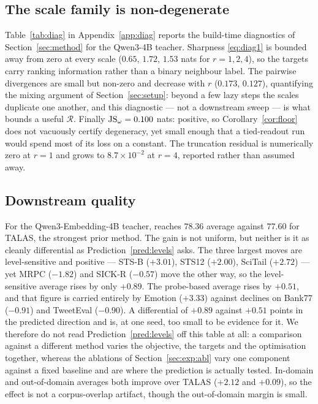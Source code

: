 \subsection{The scale family is non-degenerate}
\label{sec:exp:build}

Table~\ref{tab:diag} in Appendix~\ref{app:diag} reports the build-time diagnostics of
Section~\ref{sec:method} for the Qwen3-4B teacher. Sharpness \eqref{eq:diag1} is
bounded away from zero at every scale ($0.65$, $1.72$, $1.53$ nats for $r=1,2,4$), so the
targets carry ranking information rather than a binary neighbour label. The pairwise
divergences are small but non-zero and decrease with $r$ ($0.173$, $0.127$), quantifying the
mixing argument of Section~\ref{sec:setup}: beyond a few lazy steps the scales duplicate one
another, and this diagnostic --- not a downstream sweep --- is what bounds a useful
$\mathcal{R}$. Finally $\mathrm{JS}_\omega = 0.100$ nats: positive, so Corollary~\ref{cor:floor} does
not vacuously certify degeneracy, yet small enough that a tied-readout run would spend most
of its loss on a constant. The truncation residual is numerically zero at $r=1$ and grows to
$8.7\times10^{-2}$ at $r=4$, reported rather than assumed away.

\subsection{Downstream quality}
\label{sec:exp:main}



For the Qwen3-Embedding-4B teacher, \method reaches $78.36$ average against $77.60$ for
TALAS, the strongest prior method. The gain is not uniform, but neither is it as cleanly
differential as Prediction~\ref{pred:levels} asks. The three largest moves are
level-sensitive and positive --- STS-B ($+3.01$), STS12 ($+2.00$), SciTail ($+2.72$) --- yet
MRPC ($-1.82$) and SICK-R ($-0.57$) move the other way, so the level-sensitive average rises
by only $+0.89$. The probe-based average rises by $+0.51$, and that figure is carried
entirely by Emotion ($+3.33$) against declines on Bank77 ($-0.91$) and TweetEval ($-0.90$).
A differential of $+0.89$ against $+0.51$ points in the predicted direction and is, at one
seed, too small to be evidence for it. We therefore do not read
Prediction~\ref{pred:levels} off this table at all: a comparison against a different method
varies the objective, the targets and the optimisation together, whereas the ablations of
Section~\ref{sec:exp:abl} vary one component against a fixed baseline and are where the
prediction is actually tested. In-domain and out-of-domain averages both improve over TALAS
($+2.12$ and $+0.09$), so the effect is not a corpus-overlap artifact, though the
out-of-domain margin is small.

